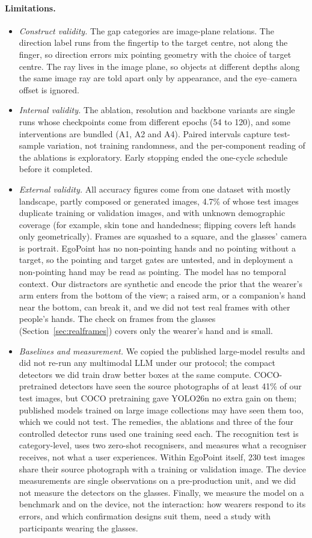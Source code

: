 \paragraph{Limitations.}
\begin{itemize}
\item \emph{Construct validity.} The gap categories are image-plane relations. The direction label runs from the fingertip to the target centre, not along the finger, so direction errors mix pointing geometry with the choice of target centre. The ray lives in the image plane, so objects at different depths along the same image ray are told apart only by appearance, and the eye--camera offset is ignored.
\item \emph{Internal validity.} The ablation, resolution and backbone variants are single runs whose checkpoints come from different epochs (54 to 120), and some interventions are bundled (A1, A2 and A4). Paired intervals capture test-sample variation, not training randomness, and the per-component reading of the ablations is exploratory. Early stopping ended the one-cycle schedule before it completed.
\item \emph{External validity.} All accuracy figures come from one dataset with mostly landscape, partly composed or generated images, 4.7\% of whose test images duplicate training or validation images, and with unknown demographic coverage (for example, skin tone and handedness; flipping covers left hands only geometrically). Frames are squashed to a square, and the glasses' camera is portrait. EgoPoint has no non-pointing hands and no pointing without a target, so the pointing and target gates are untested, and in deployment a non-pointing hand may be read as pointing. The model has no temporal context. Our distractors are synthetic and encode the prior that the wearer's arm enters from the bottom of the view; a raised arm, or a companion's hand near the bottom, can break it, and we did not test real frames with other people's hands. The check on frames from the glasses (Section~\ref{sec:realframes}) covers only the wearer's hand and is small.
\item \emph{Baselines and measurement.} We copied the published large-model results and did not re-run any multimodal LLM under our protocol; the compact detectors we did train draw better boxes at the same compute. COCO-pretrained detectors have seen the source photographs of at least 41\% of our test images, but COCO pretraining gave YOLO26n no extra gain on them; published models trained on large image collections may have seen them too, which we could not test. The remedies, the ablations and three of the four controlled detector runs used one training seed each. The recognition test is category-level, uses two zero-shot recognisers, and measures what a recogniser receives, not what a user experiences. Within EgoPoint itself, 230 test images share their source photograph with a training or validation image. The device measurements are single observations on a pre-production unit, and we did not measure the detectors on the glasses. Finally, we measure the model on a benchmark and on the device, not the interaction: how wearers respond to its errors, and which confirmation designs suit them, need a study with participants wearing the glasses.
\end{itemize}
